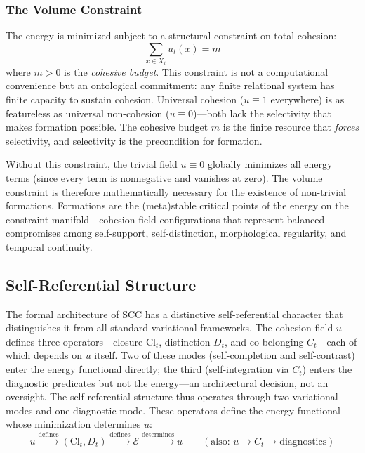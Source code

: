 \documentclass[lettersize,journal]{IEEEtran}
\begin{document}
\subsubsection{The Volume Constraint}

The energy is minimized subject to a structural constraint on total cohesion:
\begin{equation}
\sum_{x \in X_t} u_t(x) = m
\end{equation}
where $m > 0$ is the \emph{cohesive budget}. This constraint is not a computational convenience but an ontological commitment: any finite relational system has finite capacity to sustain cohesion. Universal cohesion ($u \equiv 1$ everywhere) is as featureless as universal non-cohesion ($u \equiv 0$)---both lack the selectivity that makes formation possible. The cohesive budget $m$ is the finite resource that \emph{forces} selectivity, and selectivity is the precondition for formation.

Without this constraint, the trivial field $u \equiv 0$ globally minimizes all energy terms (since every term is nonnegative and vanishes at zero). The volume constraint is therefore mathematically necessary for the existence of non-trivial formations. Formations are the (meta)stable critical points of the energy on the constraint manifold---cohesion field configurations that represent balanced compromises among self-support, self-distinction, morphological regularity, and temporal continuity.

\subsection{Self-Referential Structure}

The formal architecture of SCC has a distinctive self-referential character that distinguishes it from all standard variational frameworks. The cohesion field $u$ defines three operators---closure $\mathrm{Cl}_t$, distinction $D_t$, and co-belonging $C_t$---each of which depends on $u$ itself. Two of these modes (self-completion and self-contrast) enter the energy functional directly; the third (self-integration via $C_t$) enters the diagnostic predicates but not the energy---an architectural decision, not an oversight. The self-referential structure thus operates through two variational modes and one diagnostic mode. These operators define the energy functional whose minimization determines $u$:
\begin{equation*}
u \xrightarrow{\text{defines}} (\mathrm{Cl}_t, D_t) \xrightarrow{\text{defines}} \mathcal{E} \xrightarrow{\text{determines}} u \qquad (\text{also: } u \to C_t \to \text{diagnostics})
\end{equation*}
\end{document}
